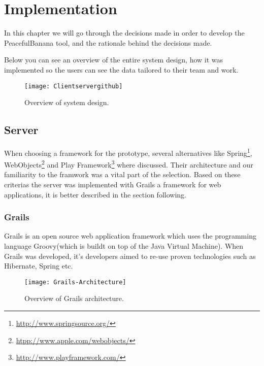 \chapter{Implementation}
\label{chap:implementation}
In this chapter we will go through the decisions made in order to develop the PeacefulBanana tool, and the rationale behind the decisions made. 

Below you can see an overview of the entire system design, how it was implemented so the users can see the data tailored to their team and work.

\begin{figure}[H]
    \centering
        \texttt{[image: Clientservergithub]}
    \caption{Overview of system design.}
    \label{ClientServerGithub}
\end{figure}

\section{Server}
When choosing a framework for the prototype, several alternatives like Spring\footnote{\url{http://www.springsource.org/}}, WebObjects\footnote{\url{htpp://www.apple.com/webobjects/}} and Play Framework\footnote{\url{http://www.playframework.com/}} where discussed. Their architecture and our familiarity to the framwork was a vital part of the selection. Based on these criterias the server was implemented with Grails a framework for web applications, it is better described in the section following.

\subsection{Grails}
Grails is an open source web application framework which uses the programming language Groovy(which is buildt on top of the Java Virtual Machine). When Grails was developed, it's developers aimed to re-use proven technologies such as Hibernate, Spring etc. 

\begin{figure}[H]
\centering
    \texttt{[image: Grails-Architecture]}
\caption{Overview of Grails architecture.}
\end{figure}

